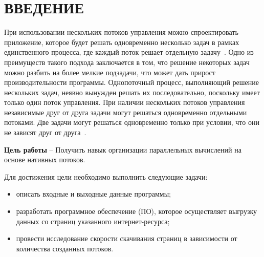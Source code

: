 \chapter*{ВВЕДЕНИЕ}

При использовании нескольких потоков управления можно спроектировать приложение, которое будет решать одновременно несколько задач в рамках единственного процесса, где каждый поток решает отдельную задачу~\cite{unix}. Одно из преимуществ такого подхода заключается в том, что решение некоторых задач можно разбить на более мелкие подзадачи, что может дать прирост производительности программы. Однопоточный процесс,
выполняющий решение нескольких задач, неявно вынужден решать их последовательно, поскольку имеет только один поток управления. При наличии нескольких потоков управления независимые друг от друга задачи могут решаться одновременно отдельными потоками. Две задачи могут решаться одновременно только при условии, что они не зависят друг от друга~\cite{unix}.

\textbf{Цель работы} -- Получить навык организации параллельных вычислений на основе нативных потоков. 

Для достижения цели необходимо выполнить следующие задачи:
\begin{itemize}[label=--]
    \item описать входные и выходные данные программы;
    \item разработать программное обеспечение (ПО), которое осуществляет выгрузку данных со страниц указанного интернет-ресурса;
    \item провести исследование скорости скачивания страниц в зависимости от количества созданных потоков. 
\end{itemize}

